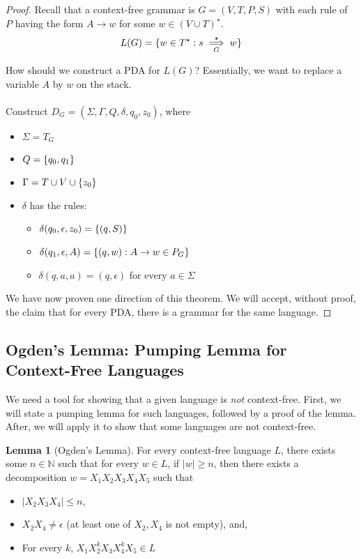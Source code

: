 \documentclass[]{article}
\DeclarePairedDelimiter{\set}{\lbrace}{\rbrace}
\theoremstyle{definition}
\newtheorem*{lemma}{Lemma}
\begin{document}
        \begin{proof}
          Recall that a context-free grammar is $G = (V, T, P, S)$ with each rule of $P$ having the form $A \to w$ for some $w \in (V \cup T)^\star$.
          $$
            L(G) = \set{w \in T^\star : s \underset{G}{\overset{\star}{\implies}} w}
          $$

          How should we construct a PDA for $L(G)$? Essentially, we want to replace a variable $A$ by $w$ on the stack.
          \\ \\
          Construct $D_G = (\Sigma, \Gamma, Q, \delta, q_0, z_0)$, where
          \begin{itemize}
            \item $\Sigma = T_G$
            \item $Q = \set{q_0, q_1}$
            \item $\Gamma = T \cup V \cup \set{z_0}$
            \item $\delta$ has the rules:
              \begin{itemize}
                \item $\delta(q_0, \epsilon, z_0) = \set{(q, S)}$
                \item $\delta(q_1, \epsilon, A) = \set{ (q, w) : A \to w \in P_G}$
                \item $\delta(q, a, a) = (q, \epsilon)$ for every $a \in \Sigma$
              \end{itemize}
          \end{itemize}

          We have now proven one direction of this theorem. We will accept, without proof, the claim that for every PDA, there is a grammar for the same language.
        \end{proof}

      \subsection{Ogden's Lemma: Pumping Lemma for Context-Free Languages}
        We need a tool for showing that a given language is \emph{not} context-free. First, we will state a pumping lemma for such languages, followed by a proof of the lemma. After, we will apply it to show that some languages are not context-free.

        \begin{lemma}[Ogden's Lemma]
          For every context-free language $L$, there exists some $n \in \mathbb{N}$ such that for every $w \in L$, if $|w| \ge n$, then there exists a decomposition $w = X_1 X_2 X_3 X_4 X_5$ such that
          \begin{itemize}
            \item $|X_2 X_3 X_4| \le n$,
            \item $X_2 X_4 \ne \epsilon$ (at least one of $X_2, X_4$ is not empty), and,
            \item For every $k$, $X_1 X_2^k X_3 X_4^k X_5 \in L$
          \end{itemize}
        \end{lemma}
\end{document}
